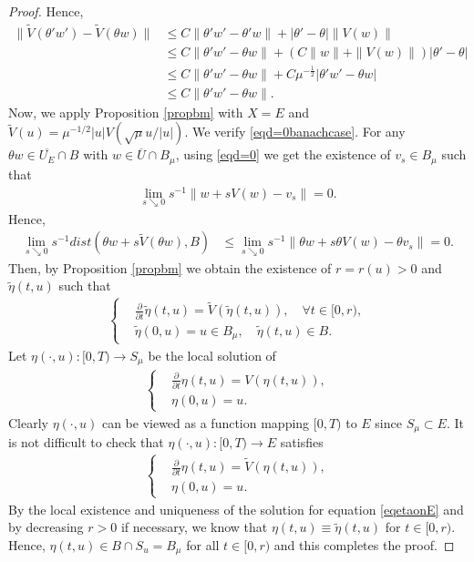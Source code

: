 \documentclass[10pt,a4paper]{amsart}
\begin{document}
\begin{proof}
    Hence,
    \begin{align*}
    	\|\widetilde{V}(\theta'w') - \widetilde{V}(\theta w)\| & \leq C\|\theta'w'-\theta'w\| + |\theta'-\theta|\|V(w)\| \\
    	& \leq C\|\theta'w'-\theta w\| + \left( C\|w\|+\|V(w)\|\right) |\theta'-\theta| \\
    	& \leq C\|\theta'w'-\theta w\|+C\mu^{-\frac12}|\theta'w'-\theta w| \\
    	& \leq C\|\theta'w'-\theta w\|.
    \end{align*}
    Now, we apply Proposition \ref{propbm} with $X = E$ and $\widetilde V(u) = \mu^{-1/2}|u|V(\sqrt \mu u/|u|)$. We verify \eqref{eqd=0banachcase}. For any $\theta w \in \overline{U_E} \cap B$ with $w \in \overline{U} \cap B_\mu$, using \eqref{eqd=0} we get the existence of $v_s \in B_\mu$ such that 
    \begin{align*}
    	\lim_{s \searrow 0}s^{-1}\|w + sV(w)-v_s\| = 0.
    \end{align*}
    Hence,
    \begin{align*}
    	\lim_{s \searrow 0}s^{-1}dist(\theta w + s\widetilde V(\theta w),B) & \leq \lim_{s \searrow 0}s^{-1}\|\theta w + s\theta V(w) - \theta v_s\| = 0.
    \end{align*}
    Then, by Proposition \ref{propbm} we obtain the existence of $r = r(u) > 0$ and $\tilde\eta(t,u)$ such that 
    \begin{align*}
    	\left\{
    	\begin{aligned}
    		& \frac{\partial}{\partial t}\tilde\eta(t,u) = \widetilde V(\tilde\eta(t,u)), \quad \forall t \in [0,r), \\
    		& \tilde\eta(0,u) = u \in B_\mu, \quad \tilde\eta(t,u) \in B.
    	\end{aligned}
    	\right.
    \end{align*}
    Let $\eta(\cdot,u): [0,T) \to S_\mu$ be the local solution of 
    \begin{align*}
    	\left\{
    	\begin{aligned}
    		& \frac{\partial}{\partial t}\eta(t,u) = V(\eta(t,u)), \\ 
    		& \eta(0,u) = u.
    	\end{aligned}
        \right.	
    \end{align*}
   Clearly $\eta(\cdot,u)$ can be viewed as a function mapping $[0,T)$ to $E$ since $S_\mu \subset E$. It is not difficult to check that $\eta(\cdot,u): [0,T) \to E$ satisfies
    \begin{align} \label{eqetaonE}
    	\left\{
    	\begin{aligned}
    		& \frac{\partial}{\partial t}\eta(t,u) = \widetilde V(\eta(t,u)), \\ 
    		& \eta(0,u) = u.
    	\end{aligned}
    	\right.	
    \end{align}
    By the local existence and uniqueness of the solution for equation \eqref{eqetaonE} and by decreasing $r >0$ if necessary, we know that $\eta(t,u) \equiv \tilde \eta(t,u)$ for $t \in [0,r)$. Hence, $\eta(t,u) \in B \cap S_u = B_\mu$ for all $t \in [0,r)$ and this completes the proof.
\end{proof}
\end{document}

